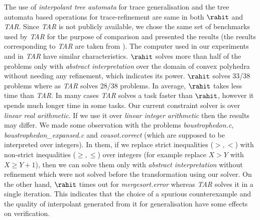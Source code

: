 The use of \emph{interpolant tree automata} for trace generalisation and the  tree automata based operations for trace-refinement are same  in both $\rahit$ and  \emph{TAR}. Since \emph{TAR} is not publicly available, we chose the same set of benchmarks  used by \emph{TAR} for the purpose of comparison and presented the results (the results corresponding to \emph{TAR} are taken from \cite{WangJ2015}). The computer used in our experiments and in \emph{TAR} \cite{WangJ2015} have similar characteristics. $\rahit$ solves more than half of the problems  only with \emph{abstract interpretation} over the domain of convex polyhedra without needing any refinement, which indicates its power. $\rahit$ solves 33/38 problems where as \emph{TAR} solves 28/38 problems. In average, $\rahit$ takes less time than \emph{TAR}. In many cases \emph{TAR} solves a task faster than $\rahit$,   however  it spends much longer time in some tasks.  
Our current constraint solver is over   \emph{linear real arithmetic}. If we use it over \emph{linear integer arithmetic} then the results may differ. 
We made some observation with   the problems  \emph{boustrophedon.c},  \emph{boustrophedon\_expansed.c} and \emph{cousot.correct} (which are supposed to be interpreted over integers). In them, if we replace strict inequalities ($>, <$)  with non-strict inequalities ($\geq,\leq$) over integers  (for example replace $X>Y$ with $X \geq Y+1$), then we can solve them only with \emph{abstract interpretation} without refinement which were not solved before the transformation using our solver.  On the other hand, $\rahit$ times out for \emph{ mergesort.error } whereas \emph{TAR} solves it in a single iteration. This indicates that the choice of a spurious counterexample and the quality of interpolant generated from it for generalisation have some effects on verification.



